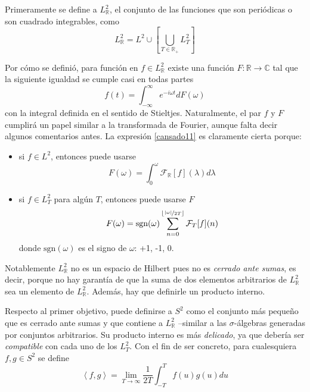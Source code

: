 \documentclass[12pt,letterpaper]{book}
\newcommand{\R}{\mathbb{R}}
\newcommand{\C}{\mathbb{C}}
\newcommand{\intR}{\int_{-\infty}^{\infty}}
\newcommand{\abso}[1]{\left| #1 \right|}
\newcommand{\producto}[1]{\left\langle #1 \right\rangle}
\newcommand{\entero}[1]{\left\lfloor #1 \right\rfloor}
\begin{document}
Primeramente se define a $L^{2}_\R$, el conjunto de las funciones que son periódicas o son cuadrado integrables, como
\begin{equation}
L^{2}_\R = L^{2} \cup \left[ \bigcup_{T\in \R_+} L^{2}_T \right]
\end{equation}

Por cómo se definió, para función en $f \in L^{2}_\R$ existe una función $F: \R \rightarrow \C$ tal que la siguiente igualdad se cumple casi en todas partes
\begin{equation}
f(t) = \intR e^{-i \omega t} dF(\omega)
\label{cansado11}
\end{equation}
con la integral definida en el sentido de Stieltjes.
%
Naturalmente, el par $f$ y $F$ cumplirá un papel similar a la transformada de Fourier, aunque falta decir algunos comentarios antes.
%
La expresión \ref{cansado11} es claramente cierta porque:
\begin{itemize}
\item si $f \in L^{2}$, entonces puede usarse 
\begin{equation*}
F(\omega)=\int_{0}^{\omega} \mathcal{F}_\R[f](\lambda) d\lambda
\end{equation*}
\item si $f \in L^{2}_T$ para algún $T$, entonces puede usarse $F$
\begin{equation*}
F(\omega) =  \text{sgn}(\omega) \sum_{n = 0}^{\entero{\nicefrac{\abso{\omega}}{2T}}} \mathcal{F}_T[f](n)
\end{equation*}
donde $\text{sgn}(\omega)$ es el signo de $\omega$: +1, -1, 0. 
\end{itemize}

Notablemente $L^{2}_\R$ no es un espacio de Hilbert pues no es \textit{cerrado ante sumas}, es decir, porque no hay garantía de que la suma de dos elementos arbitrarios de $L^{2}_\R$ sea un elemento de $L^{2}_\R$.
%
Además, hay que definirle un producto interno.

Respecto al primer objetivo, puede definirse a $S^2$ como el conjunto más pequeño que es cerrado ante sumas y que contiene a $L^{2}_\R$ --similar a las $\sigma$-álgebras generadas por conjuntos arbitrarios.
%
Su producto interno es más \textit{delicado}, ya que debería ser \textit{compatible} con cada uno de los $L^{2}_T$.
%
Con el fin de ser concreto, para cualesquiera $f, g \in S^2$ se define 
\begin{equation}
\producto{f,g} = \lim_{T\rightarrow\infty} \frac{1}{2T} \int_{-T}^T f(u) g(u) du
\end{equation}
\end{document}

